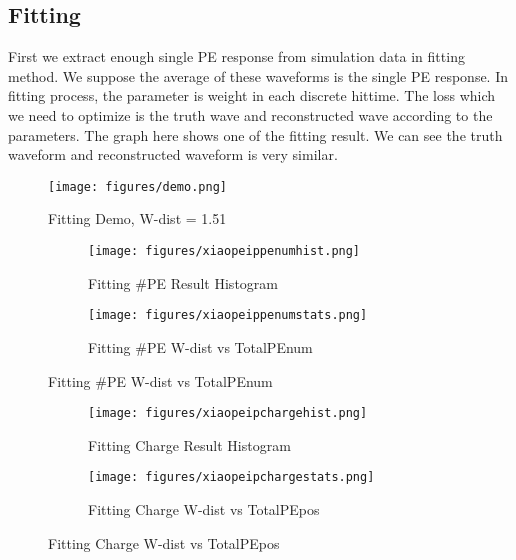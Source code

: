 \subsection{Fitting}
First we extract enough single PE response from simulation data in fitting method. We suppose the average of these waveforms is the single PE response. In fitting process, the parameter is weight in each discrete hittime. The loss which we need to optimize is the truth wave and reconstructed wave according to the parameters. The graph here shows one of the fitting result. We can see the truth waveform and reconstructed waveform is very similar. 

\begin{figure}
    \centering
    \caption{Fitting Demo, W-dist = 1.51}
    \texttt{[image: figures/demo.png]}
\end{figure}

\begin{figure}[H]
\begin{minipage}{.5\textwidth}
\begin{figure}[H]
    \centering
        \texttt{[image: figures/xiaopeippenumhist.png]}
    \caption{Fitting \#PE Result Histogram}
\end{figure}
\end{minipage}
\begin{minipage}{.5\textwidth}
\begin{figure}[H]
    \centering
        \texttt{[image: figures/xiaopeippenumstats.png]}
    \caption{Fitting \#PE W-dist vs TotalPEnum}
\end{figure}
\end{minipage}
\end{figure}
\begin{figure}[H]
\begin{minipage}{.5\textwidth}
\begin{figure}[H]
    \centering
        \texttt{[image: figures/xiaopeipchargehist.png]}
    \caption{Fitting Charge Result Histogram}
\end{figure}
\end{minipage}
\begin{minipage}{.5\textwidth}
\begin{figure}[H]
    \centering
        \texttt{[image: figures/xiaopeipchargestats.png]}
    \caption{Fitting Charge W-dist vs TotalPEpos}
\end{figure}
\end{minipage}
\end{figure}

